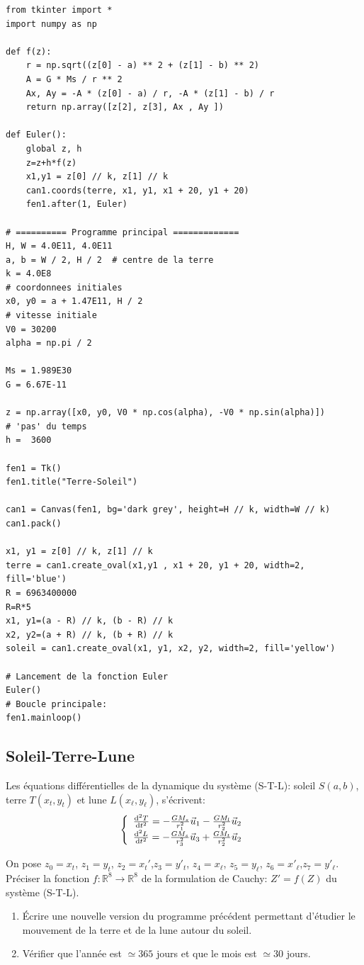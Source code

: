 \documentclass{article}
\def \de {{\rm d}}
\begin{document}
\begin{verbatim}
from tkinter import *
import numpy as np

def f(z):
    r = np.sqrt((z[0] - a) ** 2 + (z[1] - b) ** 2)
    A = G * Ms / r ** 2
    Ax, Ay = -A * (z[0] - a) / r, -A * (z[1] - b) / r
    return np.array([z[2], z[3], Ax , Ay ])

def Euler():
    global z, h
    z=z+h*f(z)
    x1,y1 = z[0] // k, z[1] // k
    can1.coords(terre, x1, y1, x1 + 20, y1 + 20)
    fen1.after(1, Euler)

# ========== Programme principal =============
H, W = 4.0E11, 4.0E11
a, b = W / 2, H / 2  # centre de la terre
k = 4.0E8
# coordonnees initiales
x0, y0 = a + 1.47E11, H / 2
# vitesse initiale
V0 = 30200
alpha = np.pi / 2

Ms = 1.989E30
G = 6.67E-11

z = np.array([x0, y0, V0 * np.cos(alpha), -V0 * np.sin(alpha)])
# 'pas' du temps
h =  3600

fen1 = Tk()
fen1.title("Terre-Soleil")

can1 = Canvas(fen1, bg='dark grey', height=H // k, width=W // k)
can1.pack()

x1, y1 = z[0] // k, z[1] // k
terre = can1.create_oval(x1,y1 , x1 + 20, y1 + 20, width=2, fill='blue')
R = 6963400000
R=R*5
x1, y1=(a - R) // k, (b - R) // k
x2, y2=(a + R) // k, (b + R) // k
soleil = can1.create_oval(x1, y1, x2, y2, width=2, fill='yellow')

# Lancement de la fonction Euler
Euler()
# Boucle principale:
fen1.mainloop()
 \end{verbatim}
\subsection{Soleil-Terre-Lune}
 Les équations différentielles de la dynamique du système (S-T-L): soleil $S(a,b)$, terre $T(x_t,y_t)$  et lune $L(x_\ell,y_\ell)$, s'écrivent: 
 \[\left\{\begin{array}{l}
  \frac{\de^2 T}{\de t^2}=-\frac{GM_s}{r_1^2}\vec u_1-\frac{GM_l}{r_2^2}\vec u_2\\
  \frac{\de^2 L}{\de t^2}=-\frac{GM_s}{r_3^2}\vec u_3+\frac{GM_t}{r_2^2}\vec u_2
  \end{array}\right.\]
 
 On pose $z_0=x_t$, $z_1=y_t$, $z_2=x_t'$,$z_3=y'_t$, $z_4=x_\ell$, $z_5=y_\ell$, $z_6=x'_\ell$,$z_7=y'_\ell$. Préciser la fonction $f:\mathbb{R}^8\to\mathbb{R}^8$ de la formulation  de Cauchy: $Z'=f(Z)$ du système (S-T-L).
\begin{enumerate}
\item Écrire une nouvelle version du programme précédent permettant d'étudier le mouvement de la terre et de la lune autour du soleil.
\item Vérifier que l'année est $\simeq 365$ jours et que le mois est $\simeq 30$ jours.
\end{enumerate}
\end{document}
